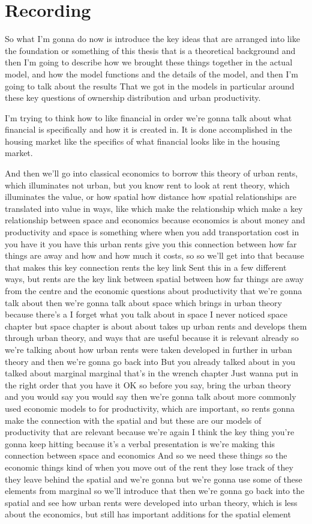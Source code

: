 \section{Recording}
So what I’m gonna do now is introduce the key ideas that are arranged into like the foundation or something of this thesis that is a theoretical background and then I’m going to describe how we brought these things together in the actual model, and how the model functions and the details of the model, and then I’m going to talk about the results That we got in the models in particular around these key questions of ownership distribution and urban productivity.

I’m trying to think how to like financial in order we’re gonna talk about what financial is specifically and how it is created in. It is done accomplished in the housing market like the specifics of what financial looks like in the housing market.

And then we’ll go into classical economics to borrow this theory of urban rents, which illuminates not urban, but you know rent to look at rent theory, which illuminates the value, or how spatial how distance how spatial relationships are translated into value in ways, like which make the relationship which make a key relationship between space and economics because economics is about money and productivity and space is something where when you add transportation cost in you have it you have this urban rents give you this connection between how far things are away and how and how much it costs, so so we’ll get into that because that makes this key connection rents the key link Sent this in a few different ways, but rents are the key link between spatial between how far things are away from the centre and the economic questions about productivity that we’re gonna talk about then we’re gonna talk about space which brings in urban theory because there’s a I forget what you talk about in space I never noticed space chapter but space chapter is about about takes up urban rents and develops them through urban theory, and ways that are useful because it is relevant already so we’re talking about how urban rents were taken developed in further in urban theory and then we’re gonna go back into But you already talked about in you talked about marginal marginal that’s in the wrench chapter
Just wanna put in the right order that you have it OK so before you say, bring the urban theory and you would say you would say then we’re gonna talk about more commonly used economic models to for productivity, which are important, so rents gonna make the connection with the spatial and but these are our models of productivity that are relevant because we’re again I think the key thing you’re gonna keep hitting because it’s a verbal presentation is we’re making this connection between space and economics And so we need these things so the economic things kind of when you move out of the rent they lose track of they they leave behind the spatial and we’re gonna but we’re gonna use some of these elements from marginal so we’ll introduce that then we’re gonna go back into the spatial and see how urban rents were developed into urban theory, which is less about the economics, but still has important additions for the spatial element

